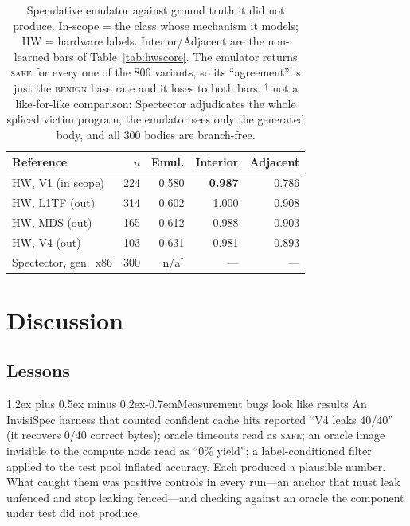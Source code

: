 \documentclass[conference]{IEEEtran}
\makeatletter
\renewcommand\paragraph{\@startsection{paragraph}{4}{\z@}%
  {1.2ex plus 0.5ex minus 0.2ex}{-0.7em}{\normalfont\normalsize\bfseries}}
\makeatother
\begin{document}
\begin{table}[t]
\centering
\caption{Speculative emulator against ground truth it did not produce.
  In-scope = the class whose mechanism it models; HW = hardware labels.
  Interior/Adjacent are the non-learned bars
  of Table~\ref{tab:hwscore}. The emulator returns \textsc{safe} for
  every one of the 806 variants, so its ``agreement'' is just the
  \textsc{benign} base rate and it loses to both bars.
  $^\dagger$ not a like-for-like comparison: Spectector adjudicates the whole
  spliced victim program, the emulator sees only the generated body, and all
  300 bodies are branch-free.}
\label{tab:specemu}
\footnotesize
\begin{tabular}{@{}lrrrr@{}}
\toprule
Reference & $n$ & Emul. & Interior & Adjacent \\
\midrule
HW, V1 (in scope)    & 224 & 0.580 & \textbf{0.987} & 0.786 \\
HW, L1TF (out)       & 314 & 0.602 & 1.000 & 0.908 \\
HW, MDS (out)        & 165 & 0.612 & 0.988 & 0.903 \\
HW, V4 (out)         & 103 & 0.631 & 0.981 & 0.893 \\
Spectector, gen.\ x86 & 300 & n/a$^\dagger$ & --- & --- \\
\bottomrule
\end{tabular}
\end{table}


\section{Discussion}
\label{sec:discussion}

\subsection{Lessons}
\label{sec:lessons}

\paragraph{Measurement bugs look like results} An InvisiSpec harness that
counted confident cache hits reported ``V4 leaks 40/40'' (it recovers 0/40
correct bytes); oracle timeouts read as \textsc{safe}; an oracle image
invisible to the compute node read as ``0\% yield''; a label-conditioned
filter applied to the test pool inflated accuracy. Each produced a plausible
number. What caught them was positive controls in every run---an anchor that
must leak unfenced and stop leaking fenced---and checking against an oracle
the component under test did not produce.
\end{document}
